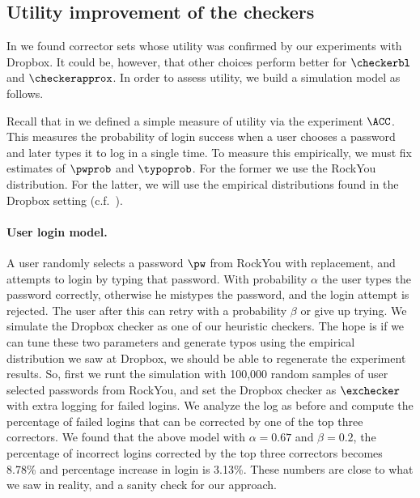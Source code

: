 \subsection{Utility improvement of the checkers}

In  we found corrector sets whose utility was confirmed by our experiments with
Dropbox. It could be, however, that other choices
perform better for $\checkerbl$ and $\checkerapprox$. 
In order to assess utility, we build a simulation model as follows. 

Recall that in  we defined a simple measure of
utility via the experiment $\ACC$. This measures the probability of
login success when a user chooses a password and later types it to log
in a single time. To measure this empirically, we must fix estimates
of $\pwprob$ and $\typoprob$. For the former we use the RockYou
distribution. For the latter, we will use the empirical distributions
found in the Dropbox setting (c.f.~).

\paragraph{User login model.} A user randomly selects a password $\pw$
from RockYou with replacement, and attempts to login by typing that
password. With probability $\alpha$ the user types the password
correctly, otherwise he mistypes the password, and the login attempt
is rejected.  The user after this can retry with a probability $\beta$
or give up trying. We simulate the Dropbox checker as one of our
heuristic checkers. The hope is if we can tune these two parameters
and generate typos using the empirical distribution we saw at Dropbox,
we should be able to regenerate the experiment results.  So, first we
runt the simulation with 100,000 random samples of user selected
passwords from RockYou, and set the Dropbox checker as $\exchecker$
with extra logging for failed logins.  We analyze the log as before
and compute the percentage of failed logins that can be corrected by
one of the top three correctors. We found that the above model with
$\alpha=0.67$ and $\beta=0.2$, the percentage of incorrect logins
corrected by the top three correctors becomes 8.78\% and percentage
increase in login is 3.13\%.  These numbers are close to what we saw
in reality, and a sanity check for our approach.

